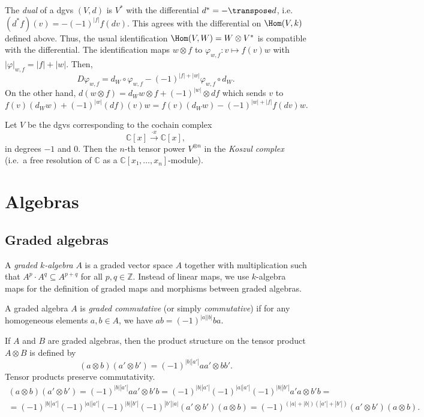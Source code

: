 \documentclass[english,no-theorem-numbers]{short-notes}
\newcommand\degree[1]{|#1|}
\newenvironment{verification}{\footnotesize\color{gray}}{}
\renewcommand\dual{*}
\begin{document}
The \emph{dual} of a dgvs $(V,d)$ is $V^\dual$ with the differential $d^\dual = - \transpose d$, i.e.\ $(d^\dual f)(v) = - (-1)^{\degree f} f(dv)$.
This agrees with the differential on $\Hom(V,k)$ defined above.
Thus, the usual identification $\Hom(V,W) = W \otimes V^\dual$ is compatible with the differential.
\begin{verification}
    The identification maps $w \otimes f$ to $φ_{w,f}\colon v \mapsto f(v)w$ with $\degree φ_{w,f} = \degree f + \degree w$.
    Then,
    \[
    Dφ_{w,f} = d_W ∘ φ_{w,f} - (-1)^{\degree f + \degree w} φ_{w,f} ∘ d_W.
    \]
    On the other hand, $d(w \otimes f) = d_Ww \otimes f + (-1)^{\degree w} \otimes df$ which sends $v$ to
    \[
    f(v)(d_Ww) + (-1)^{\degree w}(df)(v)w =
    f(v)(d_Ww) - (-1)^{\degree w + \degree f}f(dv)w.
    \]%
\end{verification}%

\begin{Ex}
    Let $V$ be the dgvs corresponding to the cochain complex
    \[
    ℂ[x] \xrightarrow{\cdot x} ℂ[x],
    \]
    in degrees $-1$ and $0$.
    Then the $n$-th tensor power $V^{\otimes n}$ in the \emph{Koszul complex} (i.e.\ a free resolution of $ℂ$ as a $ℂ[x₁,\dotsc,x_n]$-module).
\end{Ex}

\section{Algebras}

\subsection{Graded algebras}

A \emph{graded $k$-algebra} $A$ is a graded vector space $A$ together with multiplication such that $A^p\cdot A^q ⊆ A^{p+q}$ for all $p,q ∈ ℤ$.
Instead of linear maps, we use $k$-algebra maps for the definition of graded maps and morphisms between graded algebras.

A graded algebra $A$ is \emph{graded commutative} (or simply \emph{commutative}) if for any homogeneous elements $a,b ∈ A$, we have $ab = (-1)^{\degree a \degree b}ba$.

If $A$ and $B$ are graded algebras, then the product structure on the tensor product $A \otimes B$ is defined by
\[
(a \otimes b)(a' \otimes b') = (-1)^{\degree b \degree{a'}} aa' \otimes bb'.
\]
Tensor products preserve commutativity.
\begin{verification}
    \begin{multline*}
    (a \otimes b)(a' \otimes b') = 
    (-1)^{\degree b \degree{a'}} aa' \otimes b'b = 
    (-1)^{\degree b \degree{a'}}(-1)^{\degree a \degree{a'}} (-1)^{\degree b \degree{b'}} a'a \otimes b'b = \\ =
    (-1)^{\degree b \degree{a'}}(-1)^{\degree a \degree{a'}} (-1)^{\degree b \degree{b'}} (-1)^{\degree{b'} \degree a} (a' \otimes b')(a \otimes b) =
    (-1)^{(\degree a + \degree b)(\degree{a'} + \degree{b'})} (a' \otimes b')(a \otimes b).
    \end{multline*}%
\end{verification}%
\end{document}
